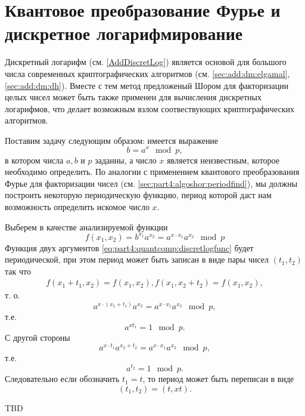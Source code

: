 \section{Квантовое преобразование Фурье и дискретное логарифмирование}
Дискретный логарифм (см. \autoref{AddDiscretLog}) является основой для
большого числа современных криптографических алгоритмов (см.
\autoref{sec:add:dm:elgamal}, \autoref{sec:add:dm:dh}). Вместе с тем 
метод предложеный Шором для факторизации целых чисел может быть также
применен для вычисления дискретных логарифмов, что делает возможным
взлом соотвествующих криптографических алгоритмов.

Поставим задачу следующим образом: имеется выражение 
\[
b = a^x \mod p,
\]
в котором числа $a, b$ и $p$ заданны, а число $x$ является
неизвестным, которое необходимо определить. По аналогии с применением
квантового преобразования Фурье для факторизации чисел (см.
\autoref{sec:part4:algoshor:periodfind}), мы должны
построить некоторую периодическую функцию, период которой даст нам
возможность определить искомое число $x$.

Выберем в качестве анализируемой функции
\begin{equation}
f\left(x_1, x_2\right) = b^{x_1}a^{x_2} = a^{x \cdot x_1} a^{x_2} \mod p
\label{eq:part4:quantcomp:discretlogfunc}
\end{equation}
Функция двух аргументов \eqref{eq:part4:quantcomp:discretlogfunc}
будет периодической, при этом период может быть записан в виде пары
чисел $(t_1, t_2)$ так что
\begin{eqnarray}
f\left(x_1 + t_1, x_2\right) = f\left(x_1, x_2\right),
f\left(x_1, x_2 + t_2\right) = f\left(x_1, x_2\right),
\end{eqnarray}
т. о. 
\[
a^{x \cdot \left( x_1 + t_1 \right)} a^{x_2} = a^{x \cdot x_1} a^{x_2}
\mod p,
\]
т.е. 
\[
a^{x t_1} = 1 \mod p.
\]
С другой стороны
\[
a^{x \cdot t_1} a^{x_2 + t_2} = a^{x \cdot x_1} a^{x_2}
\mod p,
\]
т.е.
\[
a^{t_2} = 1 \mod p.
\]
Следовательно если обозначить $t_1 = t$, то период может быть
переписан в виде
\[
(t_1, t_2) = (t, x t).
\]


TBD

